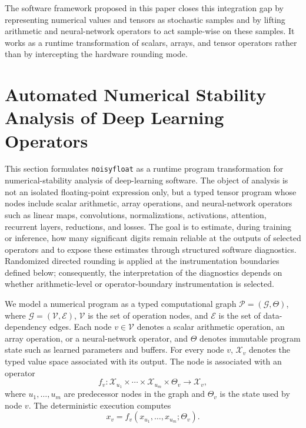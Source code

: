 \documentclass[manuscript, screen]{acmart}
\begin{document}
The software framework proposed in this paper closes this integration gap by representing numerical values and tensors as stochastic samples and by lifting arithmetic and neural-network operators to act sample-wise on these samples.  It works as a runtime transformation of scalars, arrays, and tensor operators rather than by intercepting the hardware rounding mode.



\section{Automated Numerical Stability Analysis of Deep Learning Operators}
\label{sec:method}

This section formulates \texttt{noisyfloat} as a runtime program
transformation for numerical-stability analysis of deep-learning software.
The object of analysis is not an isolated floating-point expression only, but
a typed tensor program whose nodes include scalar arithmetic, array operations,
and neural-network operators such as linear maps, convolutions, normalizations,
activations, attention, recurrent layers, reductions, and losses.  The goal is
to estimate, during training or inference, how many significant digits remain
reliable at the outputs of selected operators and to expose these estimates through
structured software diagnostics. Randomized directed rounding is applied at the
instrumentation boundaries defined below; consequently, the interpretation of
the diagnostics depends on whether arithmetic-level or operator-boundary
instrumentation is selected.


We model a numerical program as a typed computational graph $\mathcal{P}=(\mathcal{G},\Theta)$, where $\mathcal{G}=(\mathcal{V},\mathcal{E})$, $\mathcal{V}$ is the set of operation nodes, and $\mathcal{E}$ is the set of data-dependency edges. Each node $v\in\mathcal{V}$ denotes a scalar arithmetic operation, an array operation, or a neural-network operator, and $\Theta$ denotes immutable program state such as learned parameters and buffers. For every node $v$, $\mathcal{X}_v$ denotes the typed value space associated with its output. The node is associated with an operator
\begin{equation}
f_v: \mathcal{X}_{u_1}\times\cdots\times\mathcal{X}_{u_m}\times\Theta_v
\rightarrow \mathcal{X}_v,
\end{equation}
where $u_1,\ldots,u_m$ are predecessor nodes in the graph and $\Theta_v$ is the state used by node $v$. The deterministic execution computes
\begin{equation}
x_v=f_v(x_{u_1},\ldots,x_{u_m};\Theta_v).
\end{equation}
\end{document}
